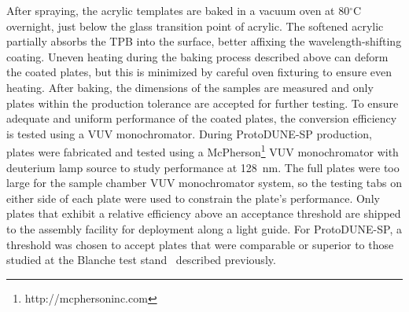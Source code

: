 After spraying, the acrylic templates are baked in a vacuum oven at 80$^{\circ}$C overnight, just below the glass transition point of acrylic. The softened acrylic partially absorbs the TPB into the surface, better affixing the wavelength-shifting coating. Uneven heating during the baking process described above can deform the coated plates, but this is minimized by careful oven fixturing to ensure even heating. After baking, the dimensions of the samples are measured and only plates within the production tolerance are accepted for further testing.
To ensure adequate and uniform performance of the coated plates, the conversion efficiency is tested using a VUV monochromator. During ProtoDUNE-SP production, plates were fabricated and tested 
using a McPherson\footnote{http://mcphersoninc.com} VUV monochromator with deuterium lamp source to study performance at 128~nm. The full plates were too large for the sample chamber
VUV monochromator system, so the testing tabs on either side of each plate were used to constrain the plate's performance. 
Only plates that exhibit a relative efficiency above an acceptance threshold are shipped to the assembly facility for deployment along a light guide. For ProtoDUNE-SP, a threshold was chosen to accept plates that were comparable or superior to those studied at the Blanche test stand~\cite{bib:DoubleShiftLG-NIM-171113} described previously.

